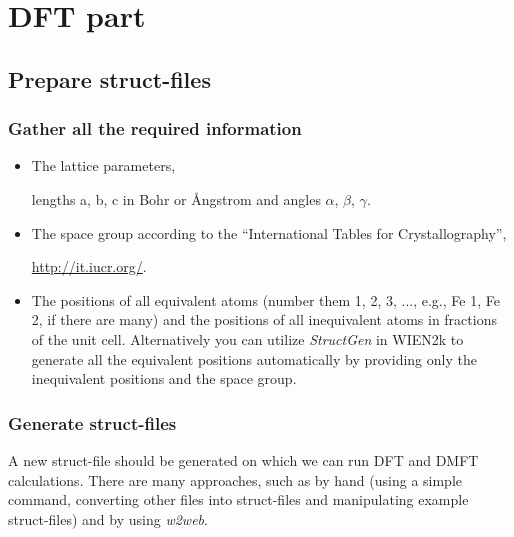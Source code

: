 \documentclass[12 pt]{article}
\begin{document}
    \section{DFT part}

      \subsection{Prepare struct-files}

	\subsubsection{Gather all the required information}

	  \begin{itemize}

	    \item  The lattice parameters,

  lengths a, b, c in Bohr or \AA{ngstrom} and angles $\alpha$, $\beta$, $\gamma$.

	    \item  The space group according to the ``International Tables for Crystallography'', 
  
  \url{http://it.iucr.org/}.

	    \item  The positions of all equivalent atoms (number them 1, 2, 3, ..., e.g., Fe 1, Fe 2, if there are 
many) and the positions of all inequivalent atoms in fractions of the unit cell. Alternatively you can utilize 
\emph{StructGen} in WIEN2k to generate all the equivalent positions automatically by providing only the inequivalent 
positions and the space group.

	  \end{itemize}

	\subsubsection{Generate struct-files}

  A new struct-file should be generated on which we can run DFT and DMFT calculations. There are many approaches, 
such as by hand (using a simple command, converting other files into struct-files and manipulating example 
struct-files) and by using \emph{w2web}.
\end{document}
